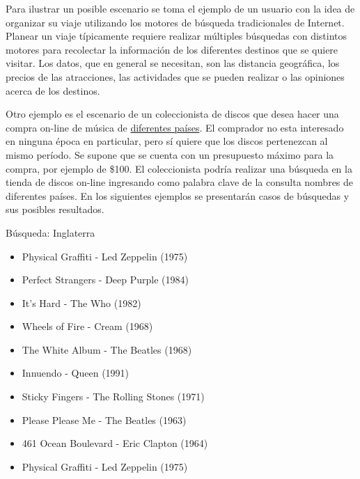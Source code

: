 Para ilustrar un posible escenario se toma el ejemplo de un usuario con la idea de organizar su viaje utilizando los motores de búsqueda tradicionales de Internet. Planear un viaje típicamente requiere realizar múltiples búsquedas con distintos motores para recolectar la información de los diferentes destinos que se quiere visitar. Los datos, que en general se necesitan, son las distancia geográfica, los precios de las atracciones, las actividades que se pueden realizar o las opiniones acerca de los destinos.

Otro ejemplo es el escenario de un coleccionista de discos que desea hacer una compra on-line de música de \underline{diferentes países}. El comprador no esta interesado en ninguna época en particular, pero sí quiere que los discos pertenezcan al mismo período. Se supone que se cuenta con un presupuesto máximo para la compra, por ejemplo de \$100. El coleccionista podría realizar una búsqueda en la tienda de discos on-line ingresando como palabra clave de la consulta nombres de diferentes países. En los siguientes ejemplos se presentarán casos de búsquedas y sus posibles resultados.

\begin{mybox}{Búsqueda: Inglaterra}
\begin{itemize}
	\item {\scriptsize Physical Graffiti - Led Zeppelin (1975)}
	\item {\scriptsize Perfect Strangers - Deep Purple (1984)}
	\item {\scriptsize It's Hard - The Who  (1982)}
	\item {\scriptsize Wheels of Fire - Cream (1968)}
	\item {\scriptsize The White Album - The Beatles (1968)}
	\item {\scriptsize Innuendo - Queen (1991)}
	\item {\scriptsize Sticky Fingers - The Rolling Stones (1971)}
	\item {\scriptsize Please Please Me - The Beatles (1963)}
	\item {\scriptsize 461 Ocean Boulevard - Eric Clapton (1964)}
	\item {\scriptsize Physical Graffiti - Led Zeppelin (1975)}
\end{itemize}
\end{mybox}

